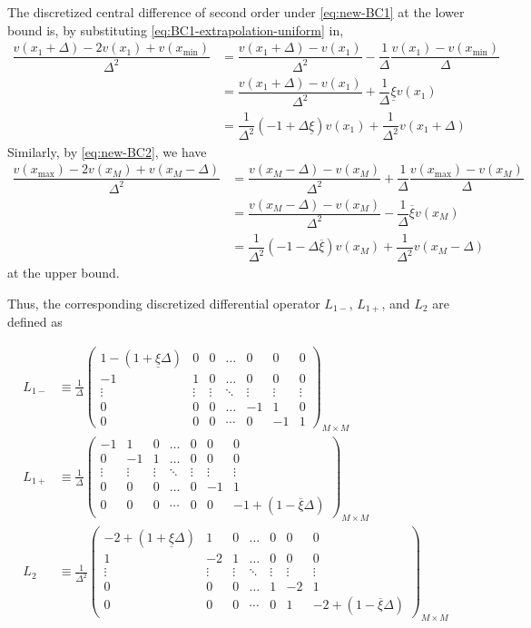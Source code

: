 \documentclass[11pt]{article}
\theoremstyle{definition}
\begin{document}
The discretized central difference of second order under \eqref{eq:new-BC1} at the lower bound is, by substituting \eqref{eq:BC1-extrapolation-uniform} in,
\begin{align}
\dfrac{v ({x_{1}} + \Delta) - 2 v({x_{1}}) + v(x_{\min})}{\Delta^2} &=   \dfrac{v({x_{1}} + \Delta) - v({x_{1}})}{\Delta^2} - \dfrac{1}{\Delta}\dfrac{v ({x_{1}}) - v(x_{\min}) }{\Delta}  \\
&= \dfrac{v({x_{1}} + \Delta) - v({x_{1}})}{\Delta^2} + \dfrac{1}{\Delta} \underline{\xi} v({x_{1}})  \\ 
&= \dfrac{1}{\Delta^2}  (- 1 + \Delta \underline{\xi}) v({x_{1}})  + \dfrac{1}{\Delta^2}  v({x_{1}} + \Delta)  
\end{align}
Similarly, by \eqref{eq:new-BC2}, we have
\begin{align}
\dfrac{v(x_{\max}) - 2 v({x_{M}} ) + v({x_{M}} -\Delta)}{\Delta^2} &=   \dfrac{v({x_{M}} - \Delta) - v({x_{M}})}{\Delta^2} + \dfrac{1}{\Delta}\dfrac{ v(x_{\max}) - v ({x_{M}}) }{\Delta}  \\
&= \dfrac{v({x_{M}} - \Delta) - v({x_{M}})}{\Delta^2}  - \dfrac{1}{\Delta} \overline{\xi} v({x_{M}})  \\ 
&= \dfrac{1}{\Delta^2}  (- 1 - \Delta \overline{\xi}) v({x_{M}})  + \dfrac{1}{\Delta^2}  v({x_{M}} - \Delta)  
\end{align}
at the upper bound.

Thus, the corresponding discretized differential operator $L_{1-}$, $L_{1+}$, and $L_2$ are defined as 

\begin{align}
L_{1-} &\equiv \frac{1}{\Delta}\begin{pmatrix}
1 - (1 + \underline{\xi} \Delta) &0&0&\dots&0&0&0\\
-1&1&0&\dots&0&0&0\\
\vdots&\vdots&\vdots&\ddots&\vdots&\vdots&\vdots\\
0&0&0&\dots&-1&1&0\\
0&0&0&\cdots&0&-1&1
\end{pmatrix}_{M\times M}\label{eq:L-1-regular} \\
L_{1+} &\equiv \frac{1}{\Delta}\begin{pmatrix}
-1&1&0&\dots&0&0&0\\
0&-1&1&\dots&0&0&0\\
\vdots&\vdots&\vdots&\ddots&\vdots&\vdots&\vdots\\
0&0&0&\dots&0&-1&1\\
0&0&0&\cdots&0&0&-1+(1-\overline{\xi} \Delta)
\end{pmatrix}_{M\times M}\label{eq:L-1-plus-regular} \\
L_2 &\equiv \frac{1}{\Delta^2}\begin{pmatrix}
-2 + (1 + \underline{\xi}\Delta) &1&0&\dots&0&0&0\\
1&-2&1&\dots&0&0&0\\
\vdots&\vdots&\vdots&\ddots&\vdots&\vdots&\vdots\\
0&0&0&\dots&1&-2&1\\
0&0&0&\cdots&0&1&-2 + (1- \overline{\xi}\Delta)
\end{pmatrix}_{M\times M}\label{eq:L-2-regular}
\end{align}
\end{document}
